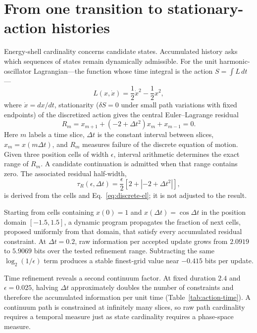 \documentclass[10pt]{article}
\begin{document}
\section*{From one transition to stationary-action histories}

Energy-shell cardinality concerns candidate states.  Accumulated history asks
which sequences of states remain dynamically admissible.  For the unit
harmonic-oscillator Lagrangian---the function whose time integral is the
action $S=\int L\,dt$---
\begin{equation}
L(x,\dot x)=\frac12\dot x^2-\frac12x^2,
\label{eq:lagrangian}
\end{equation}
where $\dot x=dx/dt$, stationarity ($\delta S=0$ under small path variations
with fixed endpoints) of the discretized action gives the central
Euler--Lagrange residual
\begin{equation}
R_m=x_{m+1}+(-2+\Delta t^2)x_m+x_{m-1}=0.
\label{eq:discrete-el}
\end{equation}
Here $m$ labels a time slice, $\Delta t$ is the constant interval between
slices, $x_m=x(m\Delta t)$, and $R_m$ measures failure of the discrete
equation of motion.  Given three position cells of width $\epsilon$, interval
arithmetic determines the exact range of $R_m$.  A candidate continuation is
admitted when that range contains zero.  The associated residual half-width,
\begin{equation}
\tau_R(\epsilon,\Delta t)
=\frac\epsilon2\left[2+|-2+\Delta t^2|\right],
\label{eq:residual-width}
\end{equation}
is derived from the cells and Eq.~\eqref{eq:discrete-el}; it is not adjusted to
the result.

Starting from cells containing $x(0)=1$ and
$x(\Delta t)=\cos\Delta t$ in the position domain $[-1.5,1.5]$, a dynamic
program propagates the fraction of next cells, proposed uniformly from that
domain, that satisfy every accumulated residual constraint.  At
$\Delta t=0.2$, raw
information per accepted update grows from $2.0919$ to $5.9069$ bits over the
tested refinement range.  Subtracting the same
$\log_2(1/\epsilon)$ term produces a stable finest-grid value near $-0.415$
bits per update.

Time refinement reveals a second continuum factor.  At fixed duration $2.4$
and $\epsilon=0.025$, halving $\Delta t$ approximately doubles the number of
constraints and therefore the accumulated information per unit time
(Table~\ref{tab:action-time}).  A continuum path is constrained at infinitely
many slices, so raw path cardinality requires a temporal measure just as state
cardinality requires a phase-space measure.
\end{document}
